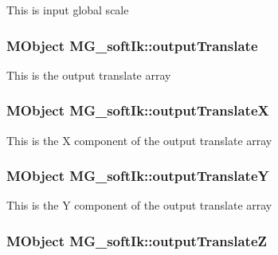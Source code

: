 This is input global scale \hypertarget{class_m_g__soft_ik_a99464e8482fc066165a2eef1cef02027}{
\subsubsection[{output\-Translate}]{\setlength{\rightskip}{0pt plus 5cm}M\-Object M\-G\-\_\-soft\-Ik\-::output\-Translate\hspace{0.3cm}{\ttfamily [static]}}}\label{class_m_g__soft_ik_a99464e8482fc066165a2eef1cef02027}
This is the output translate array \hypertarget{class_m_g__soft_ik_afe844848e40644cf73613d0592c67d16}{
\subsubsection[{output\-Translate\-X}]{\setlength{\rightskip}{0pt plus 5cm}M\-Object M\-G\-\_\-soft\-Ik\-::output\-Translate\-X\hspace{0.3cm}{\ttfamily [static]}}}\label{class_m_g__soft_ik_afe844848e40644cf73613d0592c67d16}
This is the X component of the output translate array \hypertarget{class_m_g__soft_ik_a8e1a854c6ed650a85eb0ee282a0ff986}{
\subsubsection[{output\-Translate\-Y}]{\setlength{\rightskip}{0pt plus 5cm}M\-Object M\-G\-\_\-soft\-Ik\-::output\-Translate\-Y\hspace{0.3cm}{\ttfamily [static]}}}\label{class_m_g__soft_ik_a8e1a854c6ed650a85eb0ee282a0ff986}
This is the Y component of the output translate array \hypertarget{class_m_g__soft_ik_a81840d1c2a32bb9583990881fa327359}{
\subsubsection[{output\-Translate\-Z}]{\setlength{\rightskip}{0pt plus 5cm}M\-Object M\-G\-\_\-soft\-Ik\-::output\-Translate\-Z\hspace{0.3cm}{\ttfamily [static]}}}\label{class_m_g__soft_ik_a81840d1c2a32bb9583990881fa327359}
